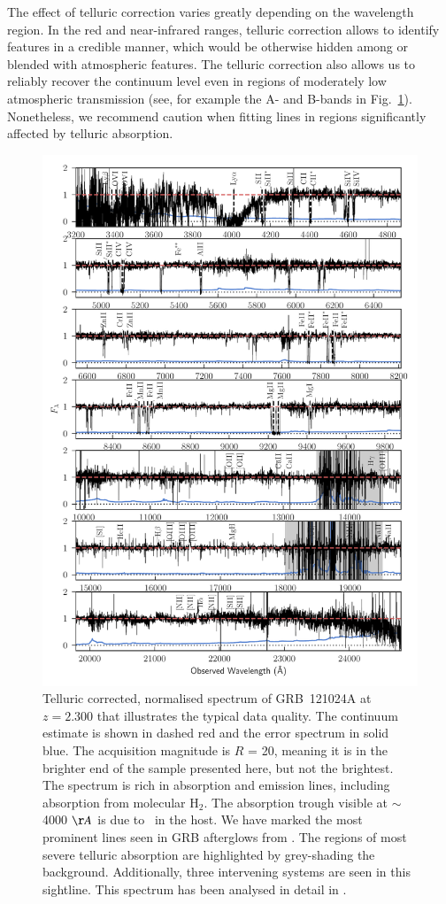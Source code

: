 \documentclass[longauth]{aa}    %
\begin{document}
The effect of telluric correction varies greatly depending on the wavelength
region. In the red and near-infrared ranges, telluric correction allows to
identify features in a credible manner, which would be otherwise hidden among or
blended with atmospheric features. The telluric correction also allows us to reliably
recover the continuum level even in regions of moderately low atmospheric
transmission (see, for example the A- and B-bands in Fig.~\ref{fig:spectrum}).
Nonetheless, we recommend caution when fitting lines in regions significantly
affected by telluric absorption.


\begin{figure}
	\centerline{\includegraphics[width=0.85\linewidth]{figures/GRB121024A.pdf}}
	\caption{Telluric corrected, normalised spectrum of GRB~121024A at $z = 2.300$
		that illustrates the typical data quality. The continuum estimate is shown in
		dashed red and the error spectrum in solid blue. The acquisition magnitude is
		$R$ = 20, meaning it is in the brighter end of the sample presented here, but
		not the brightest. The spectrum is rich in absorption and emission lines, including
		absorption from molecular $\mathrm{H_2}$. The absorption trough visible at
		$\sim$ 4000 $\AA$ is due to \lya~in the host. We have marked the most prominent
		lines seen in GRB afterglows from \citet{Christensen2011a}. The regions of most
		severe telluric absorption are highlighted by grey-shading the background.
		Additionally, three intervening systems are seen in this sightline. This
		spectrum has been analysed in detail in \citet{Friis2015}.}
	\label{fig:spectrum}
\end{figure}
\end{document}
